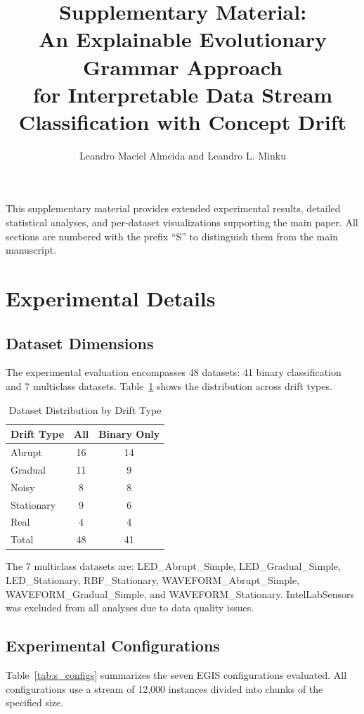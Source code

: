 \documentclass[lettersize,10pt]{article}
\title{Supplementary Material:\\An Explainable Evolutionary Grammar Approach\\for Interpretable Data Stream Classification with Concept Drift}
\author{Leandro Maciel Almeida and Leandro L. Minku}
\date{}
\begin{document}
\maketitle

\noindent This supplementary material provides extended experimental results, detailed statistical analyses, and per-dataset visualizations supporting the main paper. All sections are numbered with the prefix ``S'' to distinguish them from the main manuscript.

\tableofcontents
\clearpage


\section{Experimental Details}
\label{sec:s1}
\subsection{Dataset Dimensions}
\label{sec:s1_datasets}
The experimental evaluation encompasses 48 datasets: 41 binary classification and 7 multiclass datasets. Table~\ref{tab:s_drift_counts} shows the distribution across drift types.

\begin{table}[htbp]
\centering
\caption{Dataset Distribution by Drift Type}
\label{tab:s_drift_counts}
\begin{tabular}{lcc}
\toprule
\textbf{Drift Type} & \textbf{All} & \textbf{Binary Only} \\
\midrule
Abrupt & 16 & 14 \\
Gradual & 11 & 9 \\
Noisy & 8 & 8 \\
Stationary & 9 & 6 \\
Real & 4 & 4 \\
\midrule
Total & 48 & 41 \\
\bottomrule
\end{tabular}
\end{table}

The 7 multiclass datasets are: LED\_Abrupt\_Simple, LED\_Gradual\_Simple, LED\_Stationary, RBF\_Stationary, WAVEFORM\_Abrupt\_Simple, WAVEFORM\_Gradual\_Simple, and WAVEFORM\_Stationary. IntelLabSensors was excluded from all analyses due to data quality issues.

\subsection{Experimental Configurations}
\label{sec:s1_configs}
Table~\ref{tab:s_configs} summarizes the seven EGIS configurations evaluated. All configurations use a stream of 12{,}000 instances divided into chunks of the specified size.
\end{document}
